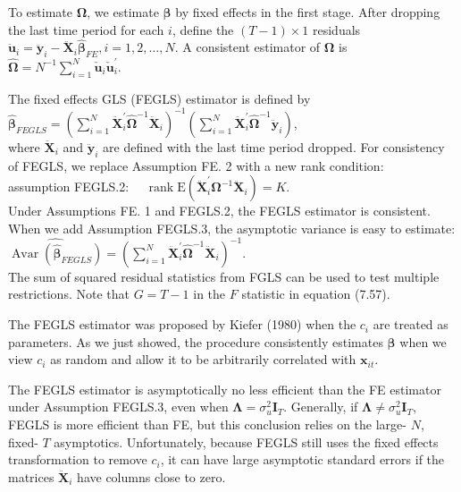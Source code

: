 \documentclass[10pt]{article}
\begin{document}
To estimate $\boldsymbol{\Omega}$, we estimate $\boldsymbol{\beta}$ by fixed effects in the first stage. After dropping the last time period for each $i$, define the $(T-1) \times 1$ residuals $\ddot{\mathbf{u}}_{i}=\ddot{\mathbf{y}}_{i}-\ddot{\mathbf{X}}_{i} \hat{\boldsymbol{\beta}}_{F E}, i= 1,2, \ldots, N$. A consistent estimator of $\boldsymbol{\Omega}$ is\\
$\hat{\boldsymbol{\Omega}}=N^{-1} \sum_{i=1}^{N} \check{\mathbf{u}}_{i} \check{\mathbf{u}}_{i}^{\prime}$.

The fixed effects GLS (FEGLS) estimator is defined by\\
$\hat{\boldsymbol{\beta}}_{F E G L S}=\left(\sum_{i=1}^{N} \ddot{\mathbf{X}}_{i}^{\prime} \hat{\boldsymbol{\Omega}}^{-1} \ddot{\mathbf{X}}_{i}\right)^{-1}\left(\sum_{i=1}^{N} \ddot{\mathbf{X}}_{i}^{\prime} \hat{\boldsymbol{\Omega}}^{-1} \ddot{\mathbf{y}}_{i}\right)$,\\
where $\ddot{\mathbf{X}}_{i}$ and $\ddot{\mathbf{y}}_{i}$ are defined with the last time period dropped. For consistency of FEGLS, we replace Assumption FE. 2 with a new rank condition:\\
assumption FEGLS.2: $\quad \operatorname{rank} \mathrm{E}\left(\ddot{\mathbf{X}}_{i}^{\prime} \boldsymbol{\Omega}^{-1} \ddot{\mathbf{X}}_{i}\right)=K$.\\
Under Assumptions FE. 1 and FEGLS.2, the FEGLS estimator is consistent. When we add Assumption FEGLS.3, the asymptotic variance is easy to estimate:\\
$\widehat{\operatorname{Avar}\left(\hat{\boldsymbol{\beta}}_{F E G L S}\right)}=\left(\sum_{i=1}^{N} \ddot{\mathbf{X}}_{i}^{\prime} \hat{\boldsymbol{\Omega}}^{-1} \ddot{\mathbf{X}}_{i}\right)^{-1}$.\\
The sum of squared residual statistics from FGLS can be used to test multiple restrictions. Note that $G=T-1$ in the $F$ statistic in equation (7.57).

The FEGLS estimator was proposed by Kiefer (1980) when the $c_{i}$ are treated as parameters. As we just showed, the procedure consistently estimates $\boldsymbol{\beta}$ when we view $c_{i}$ as random and allow it to be arbitrarily correlated with $\mathbf{x}_{i t}$.

The FEGLS estimator is asymptotically no less efficient than the FE estimator under Assumption FEGLS.3, even when $\boldsymbol{\Lambda}=\sigma_{u}^{2} \mathbf{I}_{T}$. Generally, if $\boldsymbol{\Lambda} \neq \sigma_{u}^{2} \mathbf{I}_{T}$, FEGLS is more efficient than FE, but this conclusion relies on the large- $N$, fixed- $T$ asymptotics. Unfortunately, because FEGLS still uses the fixed effects transformation to remove $c_{i}$, it can have large asymptotic standard errors if the matrices $\ddot{\mathbf{X}}_{i}$ have columns close to zero.
\end{document}
